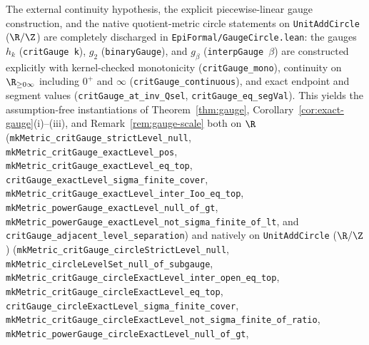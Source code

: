 The external continuity hypothesis, the explicit piecewise-linear gauge
construction, and the native quotient-metric circle statements on
\texttt{UnitAddCircle} ($\R/\Z$) are completely discharged in
\texttt{EpiFormal/\allowbreak GaugeCircle.lean}:
the gauges $h_k$ (\texttt{critGauge k}), $g_2$ (\texttt{binaryGauge}), and
$g_\beta$ (\texttt{interpGauge \ensuremath{\beta}}) are constructed explicitly
with kernel-checked monotonicity (\texttt{critGauge\_\allowbreak mono}),
continuity on $\R_{\ge0\infty}$ including $0^+$ and $\infty$
(\texttt{critGauge\_\allowbreak continuous}), and exact endpoint and segment
values (\texttt{critGauge\_\allowbreak at\_\allowbreak inv\_\allowbreak Qsel},
\texttt{critGauge\_\allowbreak eq\_\allowbreak segVal}).
This yields the assumption-free instantiations of Theorem~\ref{thm:gauge},
Corollary~\ref{cor:exact-gauge}(i)--(iii), and Remark~\ref{rem:gauge-scale} both
on $\R$
(\texttt{mkMetric\_\allowbreak critGauge\_\allowbreak strictLevel\_\allowbreak null},
\texttt{mkMetric\_\allowbreak critGauge\_\allowbreak exactLevel\_\allowbreak pos},
\texttt{mkMetric\_\allowbreak critGauge\_\allowbreak exactLevel\_\allowbreak eq\_\allowbreak top},
\texttt{critGauge\_\allowbreak exactLevel\_\allowbreak sigma\_\allowbreak finite\_\allowbreak cover},
\texttt{mkMetric\_\allowbreak critGauge\_\allowbreak exactLevel\_\allowbreak inter\_\allowbreak Ioo\_\allowbreak eq\_\allowbreak top},
\texttt{mkMetric\_\allowbreak powerGauge\_\allowbreak exactLevel\_\allowbreak null\_\allowbreak of\_\allowbreak gt},
\texttt{mkMetric\_\allowbreak powerGauge\_\allowbreak exactLevel\_\allowbreak not\_\allowbreak sigma\_\allowbreak finite\_\allowbreak of\_\allowbreak lt},
and \texttt{critGauge\_\allowbreak adjacent\_\allowbreak level\_\allowbreak separation})
and natively on \texttt{UnitAddCircle} ($\R/\Z$)
(\texttt{mkMetric\_\allowbreak critGauge\_\allowbreak circleStrictLevel\_\allowbreak null},
\texttt{mkMetric\_\allowbreak circleLevelSet\_\allowbreak null\_\allowbreak of\_\allowbreak subgauge},
\texttt{mkMetric\_\allowbreak critGauge\_\allowbreak circleExactLevel\_\allowbreak inter\_\allowbreak open\_\allowbreak eq\_\allowbreak top},
\texttt{mkMetric\_\allowbreak critGauge\_\allowbreak circleExactLevel\_\allowbreak eq\_\allowbreak top},
\texttt{critGauge\_\allowbreak circleExactLevel\_\allowbreak sigma\_\allowbreak finite\_\allowbreak cover},
\texttt{mkMetric\_\allowbreak critGauge\_\allowbreak circleExactLevel\_\allowbreak not\_\allowbreak sigma\_\allowbreak finite\_\allowbreak of\_\allowbreak ratio},
\texttt{mkMetric\_\allowbreak powerGauge\_\allowbreak circleExactLevel\_\allowbreak null\_\allowbreak of\_\allowbreak gt},

